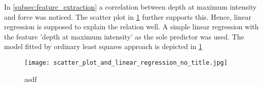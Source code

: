 

In \cref{subsec:feature_extraction} a correlation between depth at maximum intensity and force was noticed.
The scatter plot in \cref{fig:scatter_plot} further supports this.
Hence, linear regression is supposed to explain the relation well.
A simple linear regression with the feature 'depth at maximum intensity' as the sole predictor was used.
The model fitted by ordinary least squares approach is depicted in \cref{fig:scatter_plot}

\begin{figure}
    \centering
    \texttt{[image: scatter\_plot\_and\_linear\_regression\_no\_title.jpg]}
    \caption{asdf}
    \label{fig:scatter_plot}
\end{figure}

